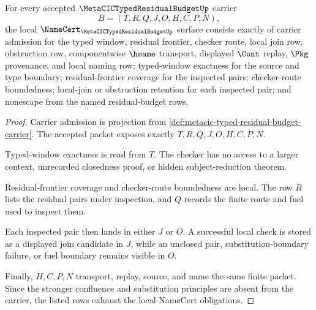 \begin{theorem}
\label{thm:metacic-typed-residual-budget-namecert-obligations}
For every accepted $\MetaCICTypedResidualBudgetUp$ carrier
$$
B=(T,R,Q,J,O,H,C,P,N),
$$
the local $\NameCert_{\MetaCICTypedResidualBudgetUp}$ surface consists exactly of carrier admission for the typed window, residual frontier, checker route, local join row, obstruction row, componentwise $\hsame$ transport, displayed $\Cont$ replay, $\Pkg$ provenance, and local naming row; typed-window exactness for the source and type boundary; residual-frontier coverage for the inspected pairs; checker-route boundedness; local-join or obstruction retention for each inspected pair; and nonescape from the named residual-budget rows.
\end{theorem}
\begin{proof}
Carrier admission is projection from \autoref{def:metacic-typed-residual-budget-carrier}. The accepted packet exposes exactly $T,R,Q,J,O,H,C,P,N$.

Typed-window exactness is read from $T$. The checker has no access to a larger context, unrecorded closedness proof, or hidden subject-reduction theorem.

Residual-frontier coverage and checker-route boundedness are local. The row $R$ lists the residual pairs under inspection, and $Q$ records the finite route and fuel used to inspect them.

Each inspected pair then lands in either $J$ or $O$. A successful local check is stored as a displayed join candidate in $J$, while an unclosed pair, substitution-boundary failure, or fuel boundary remains visible in $O$.

Finally, $H,C,P,N$ transport, replay, source, and name the same finite packet. Since the stronger confluence and substitution principles are absent from the carrier, the listed rows exhaust the local NameCert obligations.
\end{proof}


